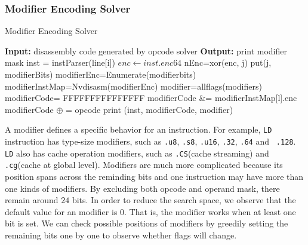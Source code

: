 \subsubsection{Modifier Encoding Solver}
\begin{algorithm}[htbp]
      \caption{Modifier Encoding Solver}\label{algo:modifier}
  \begin{algorithmic}[1]
	  \State \textbf{Input:} disassembly code generated by opcode solver
      \State \textbf{Output:} print modifier mask
      \State inst = instParser(line[i])
      \State $enc \gets inst.enc64$
      \State nEnc=xor(enc, j)
		\State put(j, modifierBits)
		\EndIf
	  \EndFor
		\State modifierEnc=Enumerate(modifierbits)
		\State modifierInstMap=Nvdisasm(modifierEnc)
		\State modifier=allflags(modifiers)
		\State modifierCode= FFFFFFFFFFFFFFF
        \State modifierCode \&= modifierInstMap[l].enc
		\EndFor
             \State modifierCode $\oplus$ = opcode 
		\EndFor
    		\State print (inst, modifierCode, modifier)                       
	  \EndFor
      
  \end{algorithmic}
\end{algorithm}
A modifier defines a specific behavior for an instruction. For example,
{\tt LD} instruction has type-size modifiers, such as {\tt .u8}, {\tt .s8}, {\tt .u16}, {\tt .32}, {\tt .64} and {\tt 
.128}. {\tt LD} also has cache operation modifiers, such as {\tt .CS}(cache streaming) and {\tt .cg}(cache at global 
level). Modifiers are much more complicated because its position spans across the reminding bits and one instruction 
may have more than one kinds of modifiers. By excluding both opcode and operand mask, there remain around $24$ bits. In 
order to reduce the search space, we observe that the default value for an modifier is $0$. That is, the modifier works when at 
least one bit is set. We can check possible positions of modifiers by greedily setting the remaining bits one by one to 
observe whether flags will change.

